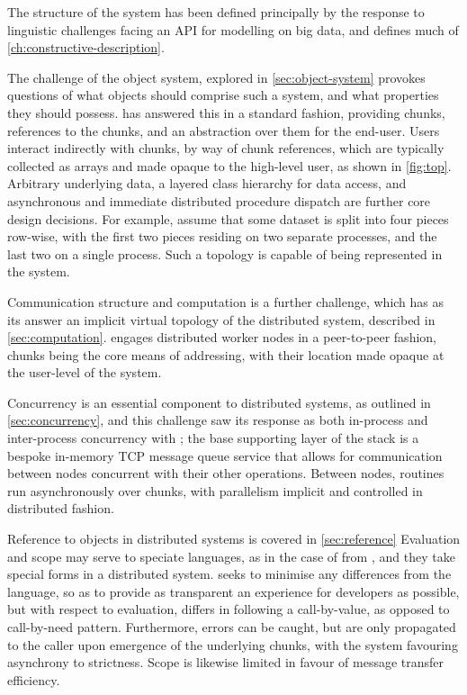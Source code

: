 The structure of the \lsr{} system has been defined principally by the response to linguistic challenges facing an API for modelling on big data, and defines much of \cref{ch:constructive-description}.

The challenge of the object system, explored in \cref{sec:object-system} provokes questions of what objects should comprise such a system, and what properties they should possess.
\lsr{} has answered this in a standard fashion, providing chunks, references to the chunks, and an abstraction over them for the end-user.
Users interact indirectly with chunks, by way of chunk references, which are typically collected as arrays and made opaque to the high-level user, as shown in \cref{fig:top}.
Arbitrary underlying data, a layered class hierarchy for data access, and asynchronous and immediate distributed procedure dispatch are further core design decisions.
For example, assume that some dataset is split into four pieces row-wise, with the first two pieces residing on two separate processes, and the last two on a single process.
Such a topology is capable of being represented in the \lsr{} system.


Communication structure and computation is a further challenge, which has as its answer an implicit virtual topology of the distributed system, described in \cref{sec:computation}.
\lsr{} engages distributed worker nodes in a peer-to-peer fashion, chunks being the core means of addressing, with their location made opaque at the user-level of the system.

Concurrency is an essential component to distributed systems, as outlined in \cref{sec:concurrency}, and this challenge saw its response as both in-process and inter-process concurrency with \lsr{}; the base supporting layer of the \lsr{} stack is a bespoke in-memory TCP message queue service that allows for communication between nodes concurrent with their other operations.
Between nodes, routines run asynchronously over chunks, with parallelism implicit and controlled in distributed fashion.

Reference to objects in distributed systems is covered in \cref{sec:reference}
Evaluation and scope may serve to speciate languages, as in the case of \R{} from , and they take special forms in a distributed system.
\lsr{} seeks to minimise any differences from the \R{} language, so as to provide as transparent an experience for developers as possible, but with respect to evaluation, differs in following a call-by-value, as opposed to call-by-need pattern.
Furthermore, errors can be caught, but are only propagated to the caller upon emergence of the underlying chunks, with the system favouring asynchrony to strictness.
Scope is likewise limited in favour of message transfer efficiency.

